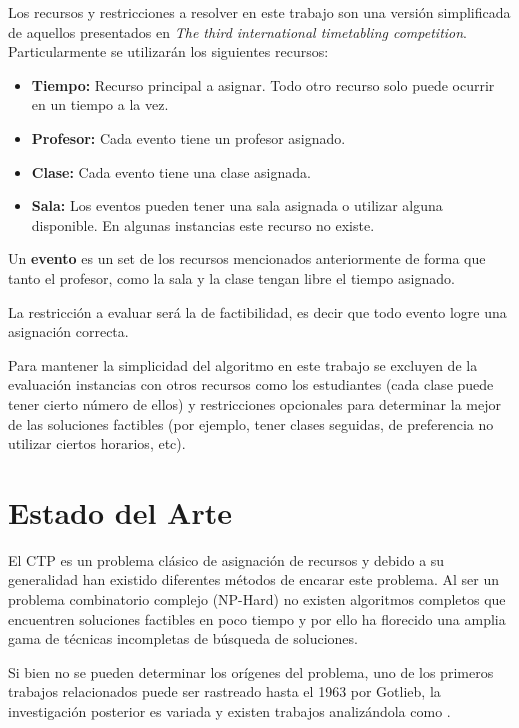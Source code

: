 \documentclass[letter, 10pt]{article}
\renewcommand{\bf}[1]{\textbf{#1}}
\begin{document}
Los recursos y restricciones a resolver en este trabajo son una versión
simplificada de aquellos presentados en \emph{The third international
timetabling competition}\cite{post2016third}. Particularmente se utilizarán
los siguientes recursos:
\begin{itemize}
  \item \bf{Tiempo:}
    Recurso principal a asignar. Todo otro recurso solo puede ocurrir en un
    tiempo a la vez.
  \item \bf{Profesor:}
    Cada evento tiene un profesor asignado.
  \item \bf{Clase:}
    Cada evento tiene una clase asignada.
  \item \bf{Sala:}
    Los eventos pueden tener una sala asignada o utilizar alguna disponible. En
    algunas instancias este recurso no existe.
\end{itemize}

Un \bf{evento} es un set de los recursos mencionados anteriormente de
forma que tanto el profesor, como la sala y la clase tengan libre el tiempo
asignado.

La restricción a evaluar será la de factibilidad, es decir que todo evento logre
una asignación correcta.

Para mantener la simplicidad del algoritmo en este trabajo se excluyen de la
evaluación instancias con otros recursos como los estudiantes (cada clase puede
tener cierto número de ellos) y restricciones opcionales para determinar la
mejor de las soluciones factibles (por ejemplo, tener clases seguidas, de
preferencia no utilizar ciertos horarios, etc).

\section{Estado del Arte}\label{sec:art}
El CTP es un problema clásico de asignación de recursos y debido a su
generalidad han existido diferentes métodos de encarar este problema.
Al ser un problema combinatorio complejo (NP-Hard) no existen algoritmos
completos que encuentren soluciones factibles en poco tiempo y por ello ha
florecido una amplia gama de técnicas incompletas de búsqueda de soluciones.

Si bien no se pueden determinar los orígenes del problema, uno de los primeros
trabajos relacionados puede ser rastreado hasta el 1963 por
Gotlieb\cite{gotlieb1963construction}, la investigación posterior es variada y
existen trabajos analizándola como \cite{schaerf1999survey}.
\end{document}
